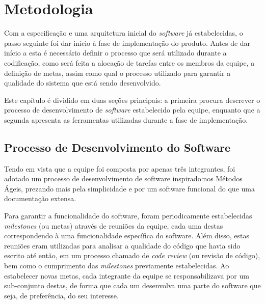 
\chapter{Metodologia}


Com a especificação e uma arquitetura inicial do \emph{software} já estabelecidas, o passo seguinte foi dar início à fase de implementação do produto.
Antes de dar início a esta é necessário definir o processo que será utilizado durante a codificação, como será feita a alocação de tarefas entre os membros da equipe, a definição de metas, assim como qual o processo utilizado para garantir a qualidade do sistema que está sendo desenvolvido.

Este capítulo é dividido em duas seções principais: a primeira procura descrever o processo de desenvolvimento de \emph{software} estabelecido pela equipe, enquanto que a segunda apresenta as ferramentas utilizadas durante a fase de implementação.


\section{Processo de Desenvolvimento do Software}

Tendo em vista que a equipe foi composta por apenas três integrantes, foi adotado um processo de desenvolvimento de software inspirado:nos Métodos Ágeis, prezando mais pela simplicidade e por um software funcional do que uma documentação extensa.

Para garantir a funcionalidade do software, foram periodicamente estabelecidas \emph{milestones} (ou metas) através de reuniões da equipe, cada uma destas correspondendo à uma funcionalidade específica do software.
Além disso, estas reuniões eram utilizadas para analisar a qualidade do código que havia sido escrito até então, em um processo chamado de \emph{code review} (ou revisão de código), bem como o cumprimento das \emph{milestones} previamente estabelecidas.
Ao estabelecer novas metas, cada integrante da equipe se responsabilizava por um sub-conjunto destas, de forma que cada um desenvolva uma parte do software que seja, de preferência, do seu interesse.

